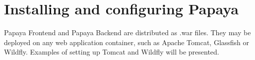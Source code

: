 \section{Installing and configuring Papaya}\label{sec:installing-papaya}

Papaya Frontend and Papaya Backend are distributed as .war files.
They may be deployed on any web application container, such as Apache Tomcat,
Glassfish or Wildfly.
Examples of setting up Tomcat and Wildfly will be presented.




